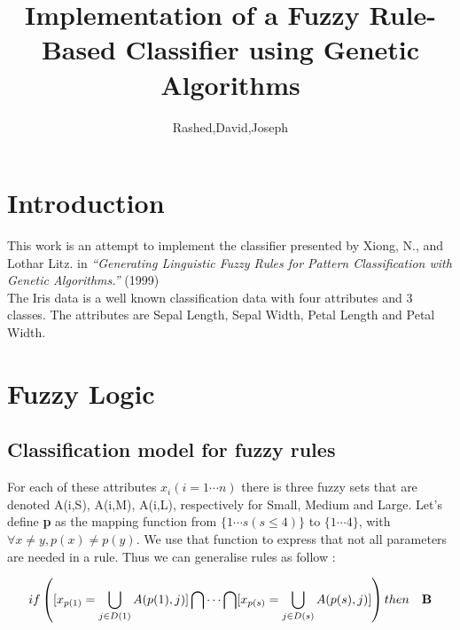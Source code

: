 \documentclass[a4paper,12pt]{article}
\begin{document}
\title{Implementation of a Fuzzy Rule-Based Classifier using Genetic Algorithms}
\author{Rashed,David,Joseph}
\maketitle

\section{Introduction}
This work is an attempt to implement the classifier presented by Xiong, N., and Lothar Litz. in \textit{“Generating Linguistic Fuzzy Rules for Pattern Classification with Genetic Algorithms.”} (1999) \\
The Iris data is a well known classification data with four attributes and 3 classes. The attributes are Sepal Length, Sepal Width, Petal Length and Petal Width. \\


\section{Fuzzy Logic}
\subsection{Classification model for fuzzy rules}
For each of these attributes $x_{i}(i=1\cdots n)$ there is three fuzzy sets that are denoted A(i,S), A(i,M), A(i,L), respectively for Small, Medium and Large.
Let's define \textbf{p} as the mapping function from $\{1\cdots s(s\leq4)\}$ to $\{1\cdots4\}$, with $\forall x\neq y, p(x)\neq p(y)$. We use that function to express that not all parameters are needed in a rule.
Thus we can generalise rules as follow :

\[if \left( [x_{p(1)}=\bigcup_{j\in D(1)}A(p(1),j) ] \bigcap\cdots\bigcap[x_{p(s)}=\bigcup_{j\in D(s)}A(p(s),j) ] \right) then\quad \bf B \] 
\end{document}
